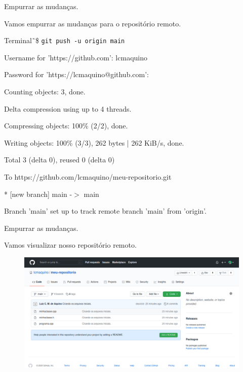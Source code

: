 \documentclass[brazil,aspectratio=169]{beamer}
\newcommand{\terminal}[1]{\textcolor{my-green}{\texttt{#1}}}
\begin{document}
\begin{frame}{Empurrar as mudanças.}

  Vamos empurrar as mudanças para o repositório remoto.

  \begin{exampleblock}{Terminal}
    \~\,\$ \terminal{git push -u origin main}

    Username for 'https://github.com': lcmaquino

    Password for 'https://lcmaquino@github.com':

    Counting objects: 3, done.

    Delta compression using up to 4 threads.

    Compressing objects: 100\% (2/2), done.

    Writing objects: 100\% (3/3), 262 bytes | 262 KiB/s, done.

    Total 3 (delta 0), reused 0 (delta 0)

    To https://github.com/lcmaquino/meu-repositorio.git

    * [new branch] main -$>$ main

    Branch 'main' set up to track remote branch 'main' from 'origin'.
  \end{exampleblock}

\end{frame}

\begin{frame}{Empurrar as mudanças.}

Vamos visualizar nosso repositório remoto.

\begin{figure}
 \includegraphics[scale=0.3]{imagens/novo-repositorio-github-4}
\end{figure}
\end{frame}
\end{document}
